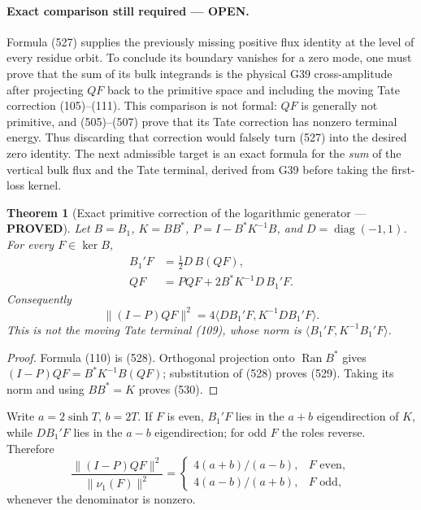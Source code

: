 \documentclass[11pt]{article}
\newtheorem{theorem}{Theorem}
\newcommand{\PROVED}{\textcolor{green!45!black}{\textbf{PROVED}}}
\newcommand{\OPEN}{\textcolor{red!70!black}{\textbf{OPEN}}}
\begin{document}
\paragraph{Exact comparison still required --- \OPEN.}
Formula (527) supplies the previously missing positive flux identity at the
level of every residue orbit.  To conclude its boundary vanishes for a
zero mode, one must prove that the sum of its bulk integrands is the
physical G39 cross-amplitude after projecting \(QF\) back to the primitive
space and including the moving Tate correction (105)--(111).  This
comparison is not formal: \(QF\) is generally not primitive, and
(505)--(507) prove that its Tate correction has nonzero terminal energy.
Thus discarding that correction would falsely turn (527) into the desired
zero identity.  The next admissible target is an exact formula for the
\emph{sum} of the vertical bulk flux and the Tate terminal, derived from
G39 before taking the first-loss kernel.

\begin{theorem}[Exact primitive correction of the logarithmic generator ---
\PROVED]
Let \(B=B_1\), \(K=BB^*\), \(P=I-B^*K^{-1}B\), and
\(D=\operatorname{diag}(-1,1)\).  For every \(F\in\ker B\),
\begin{align}
 B_1'F&=\frac12D\,B(QF),                              \tag{528}\\
 QF&=PQF+2B^*K^{-1}D\,B_1'F.                         \tag{529}
\end{align}
Consequently
\begin{equation}
 \|(I-P)QF\|^2
 =4\langle DB_1'F,K^{-1}DB_1'F\rangle.               \tag{530}
\end{equation}
This is not the moving Tate terminal (109), whose norm is
\(\langle B_1'F,K^{-1}B_1'F\rangle\).
\end{theorem}

\begin{proof}
Formula (110) is (528).  Orthogonal projection onto
\(\operatorname{Ran}B^*\) gives
\((I-P)QF=B^*K^{-1}B(QF)\); substitution of (528) proves (529).
Taking its norm and using \(BB^*=K\) proves (530).
\end{proof}

Write \(a=2\sinh T\), \(b=2T\).  If \(F\) is even, \(B_1'F\) lies in
the \(a+b\) eigendirection of \(K\), while \(DB_1'F\) lies in the
\(a-b\) eigendirection; for odd \(F\) the roles reverse.  Therefore
\begin{equation}
 \frac{\|(I-P)QF\|^2}{\|\nu_1(F)\|^2}
 =\begin{cases}
 4(a+b)/(a-b),&F\text{ even},\\
 4(a-b)/(a+b),&F\text{ odd},
 \end{cases}                                          \tag{531}
\end{equation}
whenever the denominator is nonzero.
\end{document}
